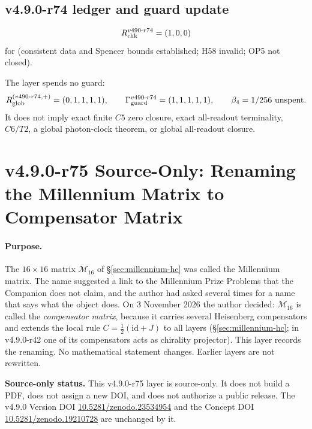\subsection*{v4.9.0-r74 ledger and guard update}
\label{subsec:v490-r74-ledger-guard}

\[
R_{\rm chk}^{v490\text{-}r74}=(1,0,0)
\]
for (consistent data and Spencer bounds established; H58 invalid; OP5 not closed).

The layer spends no guard:
\[
R_{\rm glob}^{(v490\text{-}r74,+)}=(0,1,1,1,1),
\qquad
\Gamma_{\rm guard}^{v490\text{-}r74}=(1,1,1,1,1),
\qquad
\beta_4=1/256\ \text{unspent}.
\]
It does not imply exact finite \(C5\) zero closure, exact all-readout terminality,
\(C6/T2\), a global photon-clock theorem, or global all-readout closure.

\clearpage
\section*{v4.9.0-r75 Source-Only: Renaming the Millennium Matrix to Compensator Matrix}
\label{sec:v490-r75-compensator-matrix}

\paragraph{Purpose.}
The \(16\times16\) matrix \(\mathcal M_{16}\) of \S\ref{sec:millennium-hc} was called the Millennium matrix.  The name suggested
a link to the Millennium Prize Problems that the Companion does not claim, and the author had asked several times for a name
that says what the object does.  On 3 November 2026 the author decided: \(\mathcal M_{16}\) is called the \emph{compensator
matrix}, because it carries several Heisenberg compensators and extends the local rule \(C=\tfrac12(\mathrm{id}+J)\) to all
layers (\S\ref{sec:millennium-hc}; in v4.9.0-r42 one of its compensators acts as chirality projector).  This layer records the
renaming.  No mathematical statement changes.  Earlier layers are not rewritten.

\noindent\textbf{Source-only status.}
This v4.9.0-r75 layer is source-only.  It does not build a PDF, does not assign a new DOI,
and does not authorize a public release.  The v4.9.0 Version DOI
\href{https://doi.org/10.5281/zenodo.23534954}{10.5281/zenodo.23534954} and the Concept DOI
\href{https://doi.org/10.5281/zenodo.19210728}{10.5281/zenodo.19210728} are unchanged by it.


